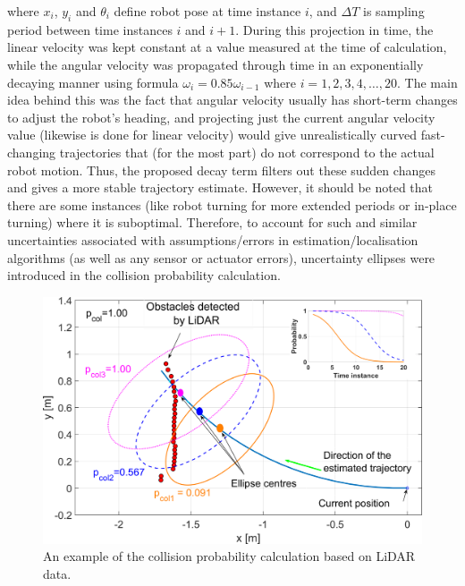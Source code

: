 where $x_i$, $y_i$ and $\theta_i$ define robot pose at time instance $i$, and $\Delta T$ is sampling period between time instances $i$ and $i+1$. During this projection in time, the linear velocity was kept constant at a value measured at the time of calculation, while the angular velocity was propagated through time in an exponentially decaying manner using formula $\omega_i=0.85\omega_{i-1}$ where $i=1,2,3,4,\ldots,20$. The main idea behind this was the fact that angular velocity usually has short-term changes to adjust the robot's heading, and projecting just the current angular velocity value (likewise is done for linear velocity) would give unrealistically curved fast-changing trajectories that (for the most part) do not correspond to the actual robot motion. Thus, the proposed decay term filters out these sudden changes and gives a more stable trajectory estimate. However, it should be noted that there are some instances (like robot turning for more extended periods or in-place turning) where it is suboptimal. Therefore, to account for such and similar uncertainties associated with assumptions/errors in estimation/localisation algorithms (as well as any sensor or actuator errors), uncertainty ellipses were introduced in the collision probability calculation.

\begin{figure}
    \centering
    \includegraphics[width=\columnwidth]{slike/Fig03_12.png}
    \caption{An example of the collision probability calculation based on LiDAR data.}
    \label{Fig:Elipse2}
\end{figure}

